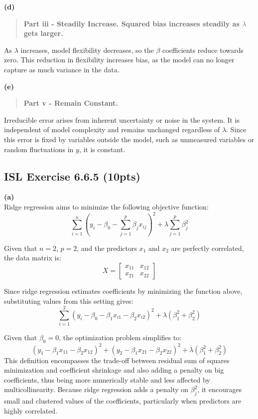 \documentclass[
  letterpaper,
  DIV=11,
  numbers=noendperiod]{scrartcl}
\begin{document}
\textbf{(d)}

\begin{quote}
\textbf{Part iii - Steadily Increase. Squared bias increases steadily as
\(\lambda\) gets larger.}
\end{quote}

As \(\lambda\) increases, model flexibility decreases, so the \(\beta\)
coefficients reduce towards zero. This reduction in flexibility
increases bias, as the model can no longer capture as much variance in
the data.

\textbf{(e)}

\begin{quote}
\textbf{Part v - Remain Constant.}
\end{quote}

Irreducible error arises from inherent uncertainty or noise in the
system. It is independent of model complexity and remains unchanged
regardless of \(\lambda\). Since this error is fixed by variables
outside the model, such as unmeasured variables or random fluctuations
in \(y\), it is constant.

\subsection{ISL Exercise 6.6.5 (10pts)}\label{isl-exercise-6.6.5-10pts}

\textbf{(a)}\\
Ridge regression aims to minimize the following objective function:\\
\[\sum_{i=1}^{n} \left( y_i - \beta_0 - \sum_{j=1}^{p} \beta_j x_{ij} \right)^2 + \lambda \sum_{j=1}^{p} \beta_j^2
\]

Given that \(n = 2\), \(p = 2\), and the predictors \(x_1\) and \(x_2\)
are perfectly correlated, the data matrix is:\\
\[
X = \begin{bmatrix} x_{11} & x_{12} \\ x_{21} & x_{22} \end{bmatrix}
\]

Since ridge regression estimates coefficients by minimizing the function
above, substituting values from this setting gives:\\
\[
\sum_{i=1}^{2} \left( y_i - \beta_0 - \beta_1 x_{i1} - \beta_2 x_{i2} \right)^2 + \lambda (\beta_1^2 + \beta_2^2)
\]

Given that \(\beta_0 = 0\), the optimization problem simplifies to:\\
\[
(y_1 - \beta_1 x_{11} - \beta_2 x_{12})^2 + (y_2 - \beta_1 x_{21} - \beta_2 x_{22})^2 + \lambda (\beta_1^2 + \beta_2^2)
\] This definition encompasses the trade-off between residual sum of
squares minimization and coefficient shrinkage and also adding a penalty
on big coefficients, thus being more numerically stable and less
affected by multicollinearity. Because ridge regression adds a penalty
on \(\beta_j^2\), it encourages small and clustered values of the
coefficients, particularly when predictors are highly correlated.
\end{document}

